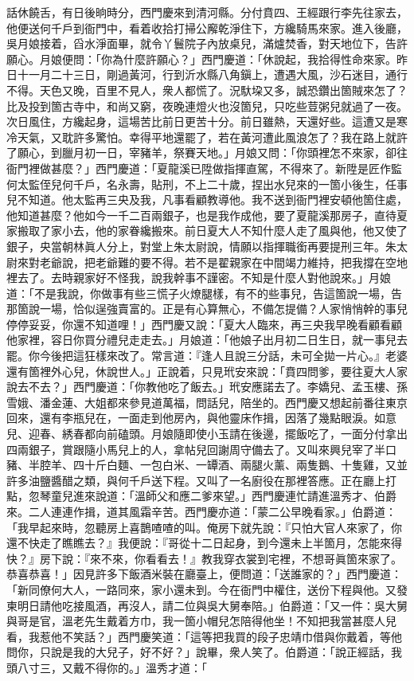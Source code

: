 話休饒舌，有日後晌時分，西門慶來到清河縣。分付賁四、王經跟行李先往家去，他便送何千戶到衙門中，看着收拾打掃公廨乾淨住下，方纔騎馬來家。進入後廳，吳月娘接着，舀水淨面畢，就令丫鬟院子內放桌兒，滿爐焚香，對天地位下，告許願心。月娘便問：「你為什麼許願心？」西門慶道：「休說起，我拾得性命來家。昨日十一月二十三日，剛過黃河，行到沂水縣八角鎭上，遭遇大風，沙石迷目，通行不得。天色又晚，百里不見人，衆人都慌了。況馱垜又多，誠恐鑽出箇賊來怎了？比及投到箇古寺中，和尚又窮，夜晚連燈火也沒箇兒，只吃些荳粥兒就過了一夜。次日風住，方纔起身，這場苦比前日更苦十分。前日雖熱，天還好些。這遭又是寒冷天氣，又耽許多驚怕。幸得平地還罷了，若在黃河遭此風浪怎了？我在路上就許了願心，{}到臘月初一日，宰豬羊，祭賽天地。」月娘又問：「你頭裡怎不來家，卻往衙門裡做甚麼？」西門慶道：「夏龍溪已陞做指揮直駕，不得來了。新陞是匠作監何太監侄兒何千戶，名永壽，貼刑，不上二十歲，捏出水兒來的一箇小後生，{}任事兒不知道。他太監再三央及我，凡事看顧教導他。我不送到衙門裡安頓他箇住處，他知道甚麼？他如今一千二百兩銀子，也是我作成他，要了夏龍溪那房子，直待夏家搬取了家小去，他的家眷纔搬來。前日夏大人不知什麼人走了風與他，他又使了銀子，央當朝林眞人分上，對堂上朱太尉說，情願以指揮職銜再要提刑三年。朱太尉來對老爺說，把老爺難的要不得。若不是翟親家在中間竭力維持，把我撐在空地裡去了。去時親家好不怪我，說我幹事不謹密。不知是什麼人對他說來。」月娘道：「不是我說，你做事有些三慌子火燎腿樣，有不的些事兒，告這箇說一場，告那箇說一場，{}恰似逞強賣富的。正是有心算無心，不備怎提備？人家悄悄幹的事兒停停妥妥，你還不知道哩！」西門慶又說：「夏大人臨來，再三央我早晚看顧看顧他家裡，容日你買分禮兒走走去。」月娘道：「他娘子出月初二日生日，就一事兒去罷。你今後把這狂樣來改了。常言道：『逢人且說三分話，未可全拋一片心。』老婆還有箇裡外心兒，{}休說世人。」{}正說着，只見玳安來說：「賁四問爹，要往夏大人家說去不去？」西門慶道：「你教他吃了飯去。」玳安應諾去了。李嬌兒、孟玉樓、孫雪娥、潘金蓮、大姐都來參見道萬福，問話兒，陪坐的。西門慶又想起前番往東京回來，還有李瓶兒在，一面走到他房內，與他靈床作揖，因落了幾點眼淚。如意兒、迎春、綉春都向前磕頭。月娘隨即使小玉請在後邊，擺飯吃了，一面分付拿出四兩銀子，賞跟隨小馬兒上的人，拿帖兒回謝周守備去了。又叫來興兒宰了半口豬、半腔羊、四十斤白麵、一包白米、一罈酒、兩腿火薰、兩隻鵝、十隻雞，又並許多油鹽醬醋之類，與何千戶送下程。又叫了一名廚役在那裡答應。正在廳上打點，忽琴童兒進來說道：「溫師父和應二爹來望。」西門慶連忙請進溫秀才、伯爵來。二人連連作揖，道其風霜辛苦。西門慶亦道：「蒙二公早晚看家。」伯爵道：「我早起來時，忽聽房上喜鵲喳喳的叫。{}俺房下就先說：『只怕大官人來家了，你還不快走了瞧瞧去？』我便說：『哥從十二日起身，到今還未上半箇月，怎能來得快？』房下說：『來不來，你看看去！』教我穿衣裳到宅裡，不想哥眞箇來家了。恭喜恭喜！」因見許多下飯酒米裝在廳臺上，便問道：「送誰家的？」西門慶道：「新同僚何大人，一路同來，家小還未到。今在衙門中權住，送份下程與他。又發柬明日請他吃接風酒，再沒人，請二位與吳大舅奉陪。」伯爵道：「又一件：吳大舅與哥是官，溫老先生戴着方巾，我一箇小帽兒怎陪得他坐！不知把我當甚麼人兒看，我惹他不笑話？」西門慶笑道：「這等把我買的段子忠靖巾借與你戴着，等他問你，只說是我的大兒子，好不好？」說畢，衆人笑了。伯爵道：「說正經話，我頭八寸三，又戴不得你的。」溫秀才道：「